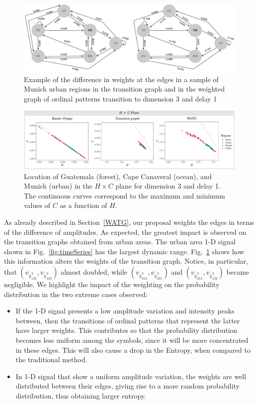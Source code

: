 \documentclass[journal]{IEEEtran}
\begin{document}
	\begin{figure}[hbt]
		\includegraphics[width=2\columnwidth]{Figures/graphs.pdf}
		\caption{Example of the difference in weights at the edges in a sample of Munich urban regions in the transition graph and in the weighted graph of ordinal patterns
			transition to dimension 3 and delay 1}
		\label{fig:graphs}
	\end{figure}
	
	\begin{figure}[hbt]
		\includegraphics[width=2\columnwidth]{Figures/HCAnalysis.pdf}
		\caption{Location of Guatemala (forest), Cape Canaveral (ocean), and Munich (urban) in the $H \times C$ plane for dimension 3 and delay 1. 
			The continuous curves correspond to the maximum and minimum values of $C$ as a function of $H$.}
		\label{fig:plotsHC}
	\end{figure}
	
	As already described in Section~\ref{WATG}, our proposal weights the edges in terms of the difference of amplitudes.
	As expected, the greatest impact is observed on the transition graphs obtained from urban areas.
	The urban area 1-D signal shown in Fig.~\ref{fig:timeSeries} has the largest dynamic range.
	Fig.~\ref{fig:graphs} shows how this information alters the weights of the transition graph.
	Notice, in particular, that 
	$(v_{\widetilde \pi^3_{123}}, v_{\widetilde \pi^3_{123}})$ almost doubled, while 
	$(v_{\widetilde \pi^3_{312}}, v_{\widetilde \pi^3_{231}})$ and $(v_{\widetilde \pi^3_{213}}, v_{\widetilde \pi^3_{132}})$ became negligible.
	We highlight the impact of the weighting on the probability distribution in the two extreme cases observed:
	\begin{itemize}
		\item If the 1-D signal presents a low amplitude variation and intensity peaks between, then the transitions of ordinal patterns that represent the latter have larger weights.
		This contributes so that the probability distribution becomes less uniform among the symbols, since it will be more concentrated in these edges.
		This will also cause a drop in the Entropy, when compared to the traditional method.
		\item In 1-D signal that show a uniform amplitude variation, the weights are well distributed between their edges, giving rise to a more random probability distribution, thus obtaining larger entropy.
	\end{itemize}
	
\end{document}
